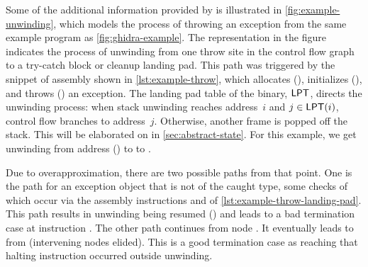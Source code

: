 Some of the additional information provided by  is illustrated in \cref{fig:example-unwinding},
which models the process of throwing an exception from the same example program as \cref{fig:ghidra-example}.
The representation in the figure indicates the process of unwinding from one throw site in the control flow graph to a try-catch block or cleanup landing pad.
This path was triggered by the snippet of assembly shown in \cref{lst:example-throw}, which allocates (), initializes (), and throws () an exception.
The landing pad table of the binary, $\operatorname{\mathsf{LPT}}$, directs the unwinding process:
when stack unwinding reaches address~$i$ and $j\in\operatorname{\mathsf{LPT}}(i)$,
control flow branches to address~$j$.
Otherwise, another frame is popped off the stack.
This will be elaborated on in
\cref{sec:abstract-state}.
For this example, we get unwinding from address () to
to .

Due to overapproximation, there are two possible paths from that point.
One is the path for an exception object that is not of the caught type,
some checks of which occur via the assembly instructions  and  of \cref{lst:example-throw-landing-pad}.
This path results in unwinding being resumed () and leads to a bad termination case at instruction .
The other path continues from node .
It eventually leads to  from  (intervening nodes elided).
This is a good termination case as reaching that halting instruction occurred outside unwinding.

